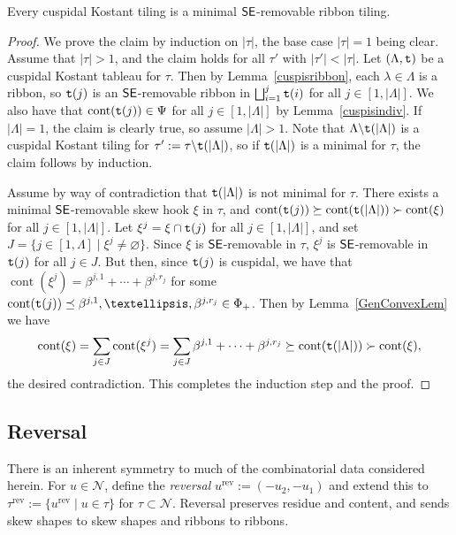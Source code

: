 \documentclass[Unicode,ALCO]{cedram}
\newcommand{\N}{\mathcal{N}}
\newcommand{\0}{{\bar 0}}
\newcommand{\ttt}{{\tt t}}
\newcommand{\ssee}{{\sf SE}}
\def\rev{{\operatorname{rev}}}
\def\cont{{\operatorname{cont}}}
\begin{document}
\begin{lemma}\label{cuspisrib}
Every cuspidal Kostant tiling is a minimal \(\ssee\)-removable ribbon tiling.
\end{lemma}
\begin{proof}
We prove the claim by induction on \(|\tau|\), the base case \(|\tau|=1\) being clear. Assume that \(|\tau| >1\), and the claim holds for all \(\tau'\) with \(|\tau'| < |\tau|\). 
Let \((\Lambda, \ttt)\) be a cuspidal Kostant tableau for \(\tau\). Then by Lemma~\ref{cuspisribbon}, each \(\lambda \in \Lambda\) is a ribbon, so \(\ttt(j)\) is an \(\ssee\)-removable ribbon in \(\bigsqcup_{i=1}^j \ttt(i)\) for all \(j \in [1, |\Lambda|]\). We also have that \(\cont(\ttt(j)) \in \Psi\) for all \(j \in [1,|\Lambda|]\) by Lemma~\ref{cuspisindiv}.
If \(|\Lambda| = 1\), the claim is clearly true, so assume \(|\Lambda|>1\). Note that \(\Lambda \backslash \ttt(|\Lambda|)\) is a cuspidal Kostant tiling for \(\tau':= \tau \backslash \ttt(|\Lambda|)\), so if \(\ttt(|\Lambda|)\) is a minimal for \(\tau\), the claim follows by induction. 

Assume by way of contradiction that \(\ttt(|\Lambda|)\) is not minimal for \(\tau\). There exists a minimal \(\ssee\)-removable skew hook \(\xi\) in \(\tau\), and \(\cont(\ttt(j)) \succeq \cont(\ttt(|\Lambda|)) \succ \cont(\xi)\) for all \(j \in [1,|\Lambda|]\). Let \(\xi^j = \xi \cap \ttt(j)\) for all \(j \in [1,|\Lambda|]\), and set \(J = \{  j \in [1,\Lambda] \mid \xi^j \neq \varnothing\}\). Since \(\xi\) is \(\ssee\)-removable in \(\tau\), \(\xi^j\) is \(\ssee\)-removable in \(\ttt(j)\) for all \(j \in J\). But then, since \(\ttt(j)\) is cuspidal, we have that \(\cont(\xi^j) = \beta^{j,1} + \cdots + \beta^{j,r_j}\) for some \(\cont(\ttt(j)) \preceq \beta^{j,1}, \ldots, \beta^{j,r_j} \in \Phi_+\). Then by Lemma~\ref{GenConvexLem} we have
\begin{align*}
\cont(\xi) = \sum_{j \in J} \cont(\xi^j) =  \sum_{j \in J} \beta^{j,1} + \cdots + \beta^{j,r_j} \succeq \cont(\ttt(|\Lambda|)) \succ \cont(\xi),
\end{align*}
the desired contradiction. This completes the induction step and the proof.
\end{proof}


\subsection{Reversal}\label{revsec}
There is an inherent symmetry to much of the combinatorial data considered herein. For \(u \in \N\), define the {\em reversal} \(u^\rev:= (-u_2,-u_1)\) and extend this to \(\tau^\rev:= \{u^\rev \mid u \in \tau\}\) for \(\tau \subset \N\). Reversal preserves residue and content, and sends skew shapes to skew shapes and ribbons to ribbons.
\end{document}
